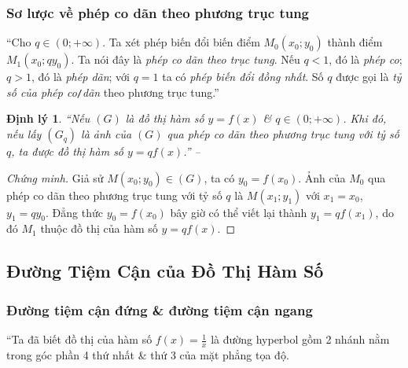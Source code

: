 \documentclass{article}
\numberwithin{equation}{section}
\newtheorem{dinhly}{Định lý}[section]
\begin{document}
\subsubsection{Sơ lược về phép co dãn theo phương trục tung}
``Cho $q\in(0;+\infty)$. Ta xét phép biến đổi biến điểm $M_0(x_0;y_0)$ thành điểm $M_1(x_0;qy_0)$. Ta nói đây là \textit{phép co dãn theo trục tung}. Nếu $q < 1$, đó là \textit{phép co}; $q > 1$, đó là \textit{phép dãn}; với $q = 1$ ta có \textit{phép biến đổi đồng nhất}. Số $q$ được gọi là \textit{tỷ số của phép co}\texttt{/}\textit{dãn} theo phương trục tung.''

\begin{dinhly}
	``Nếu $(G)$ là đồ thị hàm số $y = f(x)$ \& $q\in(0;+\infty)$. Khi đó, nếu lấy $(G_q)$ là ảnh của $(G)$ qua phép co dãn theo phương trục tung với tỷ số $q$, ta được đồ thị hàm số $y = qf(x)$.'' -- \cite[p. 8]{TL_chuyen_Toan_Giai_Tich_12}
\end{dinhly}

\begin{proof}[Chứng minh]
	Giả sử $M(x_0;y_0)\in(G)$, ta có $y_0 = f(x_0)$. Ảnh của $M_0$ qua phép co dãn theo phương trục tung với tỷ số $q$ là $M(x_1;y_1)$ với $x_1 = x_0$, $y_1 = qy_0$. Đẳng thức $y_0 = f(x_0)$ bây giờ có thể viết lại thành $y_1 = qf(x_1)$, do đó $M_1$ thuộc đồ thị của hàm số $y = qf(x)$.
\end{proof}


\subsection{Đường Tiệm Cận của Đồ Thị Hàm Số}

\subsubsection{Đường tiệm cận đứng \& đường tiệm cận ngang}
``Ta đã biết đồ thị của hàm số $f(x) = \frac{1}{x}$ là đường hyperbol gồm 2 nhánh nằm trong góc phần 4 thứ nhất \& thứ 3 của mặt phẳng tọa độ.
\end{document}
